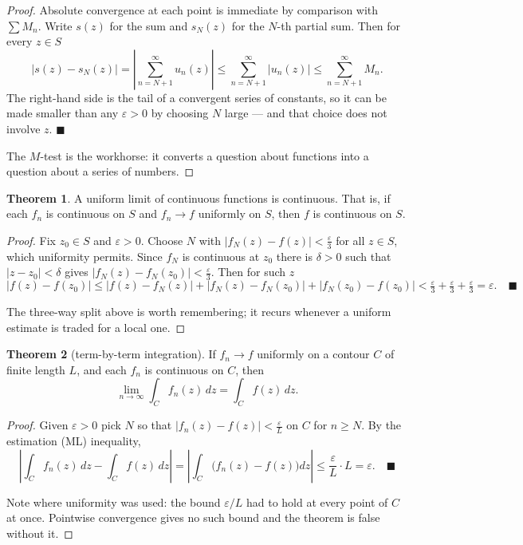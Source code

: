 \documentclass[11pt,a4paper]{article}
\theoremstyle{definition}
\newtheorem{thm}{Theorem}[section]
\begin{document}
\begin{proof}
Absolute convergence at each point is immediate by comparison with
$\sum M_n$. Write $s(z)$ for the sum and $s_N(z)$ for the $N$-th partial sum.
Then for every $z \in S$
$$\left|s(z) - s_N(z)\right| = \left|\sum^{\infty}_{n = N+1} u_n(z)\right|
\leq \sum^{\infty}_{n = N+1}\left|u_n(z)\right|
\leq \sum^{\infty}_{n = N+1} M_n .$$
The right-hand side is the tail of a convergent series of constants, so it can be
made smaller than any $\varepsilon > 0$ by choosing $N$ large --- and that choice
does not involve $z$. $\blacksquare$

The $M$-test is the workhorse: it converts a question about functions into a
question about a series of numbers.
\end{proof}

\begin{thm}
A uniform limit of continuous functions is continuous. That is, if each $f_n$ is
continuous on $S$ and $f_n \rightarrow f$ uniformly on $S$, then $f$ is
continuous on $S$.
\end{thm}

\begin{proof}
Fix $z_0 \in S$ and $\varepsilon > 0$. Choose $N$ with
$\left|f_N(z) - f(z)\right| < \tfrac{\varepsilon}{3}$ for all $z \in S$, which
uniformity permits. Since $f_N$ is continuous at $z_0$ there is $\delta > 0$ such
that $\left|z - z_0\right| < \delta$ gives
$\left|f_N(z) - f_N(z_0)\right| < \tfrac{\varepsilon}{3}$. Then for such $z$
$$\left|f(z) - f(z_0)\right| \leq \left|f(z) - f_N(z)\right| +
\left|f_N(z) - f_N(z_0)\right| + \left|f_N(z_0) - f(z_0)\right|
< \tfrac{\varepsilon}{3} + \tfrac{\varepsilon}{3} + \tfrac{\varepsilon}{3}
= \varepsilon . \quad \blacksquare$$

The three-way split above is worth remembering; it recurs whenever a uniform
estimate is traded for a local one.
\end{proof}

\begin{thm}[term-by-term integration]
If $f_n \rightarrow f$ uniformly on a contour $C$ of finite length $L$, and each
$f_n$ is continuous on $C$, then
$$\lim_{n \rightarrow \infty}\int_C f_n(z)\,dz = \int_C f(z)\,dz .$$
\end{thm}

\begin{proof}
Given $\varepsilon > 0$ pick $N$ so that
$\left|f_n(z) - f(z)\right| < \frac{\varepsilon}{L}$ on $C$ for $n \geq N$. By
the estimation (ML) inequality,
$$\left|\int_C f_n(z)\,dz - \int_C f(z)\,dz\right|
= \left|\int_C \big(f_n(z) - f(z)\big)dz\right|
\leq \frac{\varepsilon}{L}\cdot L = \varepsilon . \quad \blacksquare$$

Note where uniformity was used: the bound $\varepsilon / L$ had to hold at every
point of $C$ at once. Pointwise convergence gives no such bound and the theorem
is false without it.
\end{proof}
\end{document}
